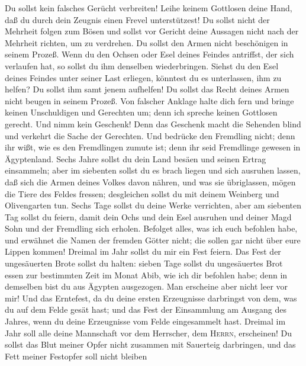  Du sollst kein falsches Gerücht verbreiten! Leihe keinem
Gottlosen deine Hand, daß du durch dein Zeugnis einen Frevel
unterstützest!  Du sollst nicht der Mehrheit folgen zum
Bösen und sollst vor Gericht deine Aussagen nicht nach der Mehrheit
richten, um zu verdrehen.  Du sollst den Armen nicht
beschönigen in seinem Prozeß.  Wenn du den Ochsen oder
Esel deines Feindes antriffst, der sich verlaufen hat, so sollst du ihm
denselben wiederbringen.  Siehst du den Esel deines
Feindes unter seiner Last erliegen, könntest du es unterlassen, ihm zu
helfen? Du sollst ihm samt jenem aufhelfen!  Du sollst das
Recht deines Armen nicht beugen in seinem Prozeß.  Von
falscher Anklage halte dich fern und bringe keinen Unschuldigen und
Gerechten um; denn ich spreche keinen Gottlosen gerecht. 
Und nimm kein Geschenk! Denn das Geschenk macht die Sehenden blind und
verkehrt die Sache der Gerechten.  Und bedrücke den
Fremdling nicht; denn ihr wißt, wie es den Fremdlingen zumute ist; denn
ihr seid Fremdlinge gewesen in Ägyptenland.  Sechs Jahre
sollst du dein Land besäen und seinen Ertrag einsammeln; 
aber im siebenten sollst du es brach liegen und sich ausruhen lassen,
daß sich die Armen deines Volkes davon nähren, und was sie übriglassen,
mögen die Tiere des Feldes fressen; desgleichen sollst du mit deinem
Weinberg und Olivengarten tun.  Sechs Tage sollst du
deine Werke verrichten, aber am siebenten Tag sollst du feiern, damit
dein Ochs und dein Esel ausruhen und deiner Magd Sohn und der Fremdling
sich erholen.  Befolget alles, was ich euch befohlen
habe, und erwähnet die Namen der fremden Götter nicht; die sollen gar
nicht über eure Lippen kommen!  Dreimal im Jahr sollst du
mir ein Fest feiern.  Das Fest der ungesäuerten Brote
sollst du halten: sieben Tage sollst du ungesäuertes Brot essen zur
bestimmten Zeit im Monat Abib, wie ich dir befohlen habe; denn in
demselben bist du aus Ägypten ausgezogen. Man erscheine aber nicht leer
vor mir!  Und das Erntefest, da du deine ersten
Erzeugnisse darbringst von dem, was du auf dem Felde gesät hast; und das
Fest der Einsammlung am Ausgang des Jahres, wenn du deine Erzeugnisse
vom Felde eingesammelt hast.  Dreimal im Jahr soll alle
deine Mannschaft vor dem Herrscher, dem \textsc{Herrn}, erscheinen!
 Du sollst das Blut meiner Opfer nicht zusammen mit
Sauerteig darbringen, und das Fett meiner Festopfer soll nicht bleiben
